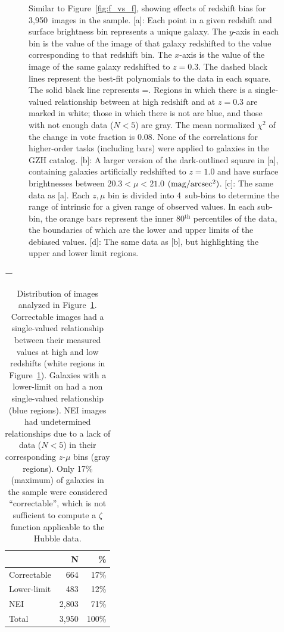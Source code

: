 \documentclass[twocolumn]{aastex6}
\begin{document}
\begin{figure}
\caption{Similar to Figure~\ref{fig:f_vs_f}, showing effects of redshift bias for 3,950~images in the \ferengi{} sample. [a]: Each point in a given redshift and surface brightness bin represents a unique galaxy. The $y$-axis in each bin is the \ffeatures{} value of the image of that galaxy redshifted to the value corresponding to that redshift bin. The $x$-axis is the \ffeatures{} value of the image of the same galaxy redshifted to $z=0.3$. The dashed black lines represent the best-fit polynomials to the data in each square. The solid black line represents \ffeaturesz=\ffeaturesrest. Regions in which there is a single-valued relationship between \ffeatures{} at high redshift and at $z=0.3$ are marked in white; those in which there is not are blue, and those with not enough data ($N<5$) are gray. The mean normalized $\chi^2$ of the change in vote fraction is 0.08. None of the correlations for higher-order tasks (including bars) were applied to galaxies in the GZH catalog. [b]: A larger version of the dark-outlined square in [a], containing \ferengi{} galaxies artificially redshifted to $z=1.0$ and have surface brightnesses between $20.3 < \mu < 21.0$ $\rm (mag/arcsec^2)$. [c]: The same data as [a]. Each $z,\mu$ bin is divided into 4~sub-bins to determine the range of intrinsic \ffeaturesrest{} for a given range of observed \ffeaturesz{} values. In each sub-bin, the orange bars represent the inner 80$^\mathrm{th}$ percentiles of the data, the boundaries of which are the lower and upper limits of the debiased values. [d]: The same data as [b], but highlighting the upper and lower limit regions.}
\label{fig:f_vs_fbar}
\end{figure}

\begin{table}ー
\label{tbl:ferengi_bar}
\caption{Distribution of \ferengi{} images analyzed in Figure~\ref{fig:f_vs_fbar}. Correctable images had a single-valued relationship between their measured \fbar{} values at high and low redshifts (white regions in Figure~\ref{fig:f_vs_fbar}). Galaxies with a lower-limit on \fbar{} had a non single-valued relationship (blue regions). NEI images had undetermined relationships due to a lack of data ($N<5$) in their corresponding $z$-$\mu$ bins (gray regions). Only 17\% (maximum) of \ferengi{} galaxies in the sample were considered ``correctable'', which is not sufficient to compute a $\zeta$ function applicable to the Hubble data.   \label{tbl:ferengi_bar_corrections}}
\begin{tabular}{lrr}
\hline \hline
				                   & N       & \% \\
\hline 
Correctable                        & 664   & 17\% \\
Lower-limit                        & 483   & 12\% \\
NEI                                & 2,803     & 71\%\\
Total                              & 3,950   & 100\% \\
\hline \hline
\end{tabular}
\end{table}
\end{document}
